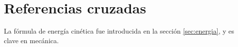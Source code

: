 \documentclass{article}
\numberwithin{equation}{section}
\begin{document}
\section{Referencias cruzadas}

La fórmula de energía cinética fue introducida en la sección \ref{sec:energia}, y es clave en mecánica.

\label{sec:energia}

\end{document}
